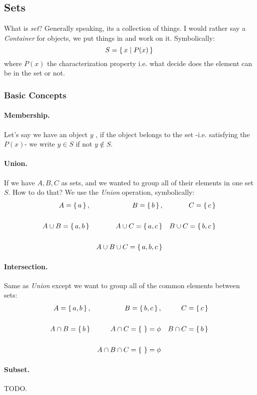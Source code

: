 \subsection{Sets}
What is {\it set}? Generally speaking, its a collection of things. I would rather say a {\it Container} for objects, we put things in and work on it. Symbolically:
$$
S = \set{x \mid P(x)}
$$
where $P(x)$ the characterization property i.e. what decide does the element can be in the set or not.
\subsubsection{Basic Concepts}
\paragraph{Membership.}
Let's say we have an object $y$ , if the object belongs to the set -i.e. satisfying the $P(x)$- we write $y \in S$ if not $y \not\in S$.
\paragraph{Union.}
If we have $A,B,C$ as sets, and we wanted to group all of their elements in one set $S$. How to do that? We use the {\it Union} operation, symbolically:
\begin{align*}
        \space A = \set{a} , && B = \set{b} , && C = \set{c} \\
        \\ 
        A \cup B = \set{a,b} && A \cup C = \set{a,c} && B \cup C = \set{b,c} \\
        \\
        && A \cup B \cup C = \set{a,b,c}
\end{align*}
\paragraph{Intersection.}
Same as {\it Union } except we want to group all of the common elements between sets:
\begin{align*}
        \space A = \set{a,b} , && B = \set{b,c} , && C = \set{c} \\
        \\ 
        A \cap B = \set{b} && A \cap C = \set{ } = \phi && B \cap C = \set{b} \\
        \\
        && A \cap B \cap C = \set{ } = \phi
\end{align*}
\paragraph{Subset.}
TODO.
